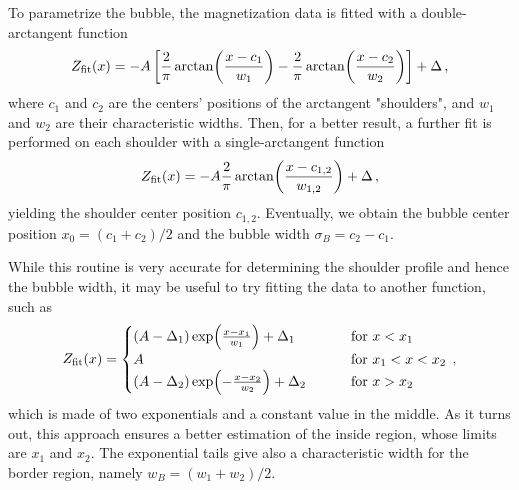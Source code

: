 To parametrize the bubble, the magnetization data is fitted with a double-arctangent function
\begin{equation}
    Z_{\rm fit}(x) = -A \left[\frac{2}{\pi}\arctan(\frac{x-c_1}{w_1}) - \frac{2}{\pi}\arctan(\frac{x-c_2}{w_2})\right] + \Delta\, ,
    \label{eq:double-atan}
\end{equation}
where $c_1$ and $c_2$ are the centers' positions of the arctangent "shoulders", and $w_1$ and $w_2$ are their characteristic widths. 
Then, for a better result, a further fit is performed on each shoulder with a single-arctangent function
\begin{equation}
    Z_{\rm fit}(x) = -A \frac{2}{\pi}\arctan(\frac{x-c_{1,2}}{w_{1,2}}) + \Delta\, ,
    \label{eq:atan}
\end{equation}
yielding the shoulder center position $c_{1,2}$. Eventually, we obtain the bubble center position $x_0 = (c_1 + c_2)/2$ and the bubble width $\sigma_B = c_2 - c_1$.

While this routine is very accurate for determining the shoulder profile and hence the bubble width, it may be useful to try fitting the data to another function, such as
\begin{equation}
    Z_{\rm fit}(x) = 
    \begin{cases}
        (A-\Delta_1) \exp(\frac{x-x_1}{w_1}) + \Delta_1 \qquad\quad &\text{for } x < x_1\\
        A \qquad\qquad\qquad\qquad &\text{for } x_1 < x < x_2\\
        (A-\Delta_2) \exp(-\frac{x-x_2}{w_2}) + \Delta_2 \qquad &\text{for } x > x_2
    \end{cases}\, ,
    \label{eq:fit_exp}
\end{equation}
which is made of two exponentials and a constant value in the middle. As it turns out, this approach ensures a better estimation of the inside region, whose limits are $x_1$ and $x_2$. The exponential tails give also a characteristic width for the border region, namely $w_B = (w_1 + w_2)/2$.

